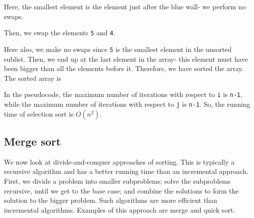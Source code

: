 \documentclass[a4paper, openany]{memoir}
\begin{document}
Here, the smallest element is the element just after the blue wall- we perform no swaps.
\begin{center}
\end{center}
Then, we swap the elements \texttt{5} and \texttt{4}.
\begin{center}
\end{center}
Here also, we make no swaps since \texttt{5} is the smallest element in the unsorted sublist. Then, we end up at the last element in the array- this element must have been bigger than all the elements before it. Therefore, we have sorted the array. The sorted array is
\begin{center}
\end{center}
In the pseudocode, the maximum number of iterations with respect to \texttt{i} is \texttt{n-1}, while the maximum number of iterations with respect to \texttt{j} is \texttt{n-1}. So, the running time of selection sort is $O(n^2)$.

\subsection{Merge sort}
We now look at divide-and-conquer approaches of sorting. This is typically a recursive algorithm and has a better running time than an incremental approach. First, we divide a problem into smaller subproblems; solve the subproblems recursive, until we get to the base case; and combine the solutions to form the solution to the bigger problem. Such algorithms are more efficient than incremental algorithms. Examples of this approach are merge and quick sort.
\end{document}
